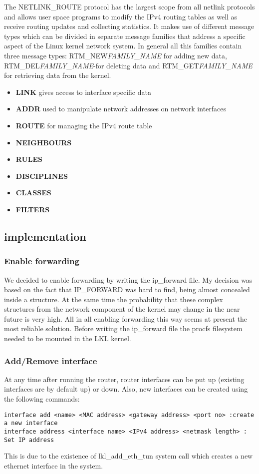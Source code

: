 {{The NETLINK_ROUTE protocol has the largest scope from all netlink protocols and allows user space programs to modify the IPv4 routing tables as well as receive routing updates and collecting statistics. It makes use of  different message types which can be divided in separate message families that address a specific aspect of the Linux kernel network system. In general all this families contain three message types: RTM_NEW\textit{FAMILY_NAME} for adding new data, RTM_DEL\textit{FAMILY_NAME}-for deleting data and RTM_GET\textit{FAMILY_NAME} for retrieving data from the kernel.
\begin{itemize}
\item{\bf LINK} gives access to interface specific data
\item{\bf ADDR} used to manipulate network addresses on network interfaces
\item{\bf ROUTE} for managing the IPv4 route table
\item{\bf NEIGHBOURS}
\item{\bf RULES}
\item{\bf DISCIPLINES}
\item{\bf CLASSES}
\item{\bf FILTERS}
\end{itemize} 

\subsection{\project implementation}
\label{sub-sec:router-lklnet}
\subsubsection{Enable forwarding}
We decided to enable forwarding by writing the ip_forward file. My decision was based on the fact that IP_FORWARD was hard to find, being almost concealed inside a structure. At the same time the probability that these complex structures from the network component of the kernel may change in the near future is very high. All in all enabling forwarding this way seems at present the most reliable solution.
Before writing the ip_forward file the procfs filesystem needed to be mounted in the LKL kernel. 

\subsubsection{Add/Remove interface}
At any time after running the router, router interfaces can be put up (existing interfaces are by default up) or down. Also, new interfaces can be created using the following commands:
\lstset{language=zsh,caption=Adding a new interface,label=lst:saddrule}
\begin{lstlisting}
interface add <name> <MAC address> <gateway address> <port no> :create a new interface
interface address <interface name> <IPv4 address> <netmask length> : Set IP address 
\end{lstlisting}  
This is due to the existence of lkl_add_eth_tun system call which creates a new ethernet interface in the system.
 
}}
